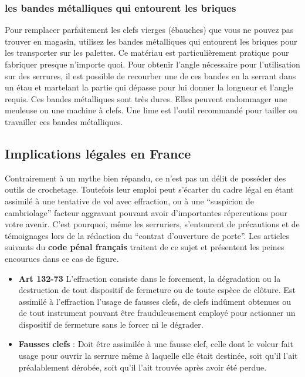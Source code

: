 \documentclass[a4paper,french,11pt,twoside]{report}
\begin{document}
\subsubsection{les bandes métalliques qui entourent les briques}
Pour remplacer parfaitement les clefs vierges (ébauches) que vous ne pouvez pas trouver en magasin, utilisez les bandes métalliques qui entourent les briques pour les transporter sur les palettes. Ce matériau est particulièrement pratique pour fabriquer presque n'importe quoi. Pour obtenir l'angle nécessaire pour l'utilisation sur des serrures, il est possible de recourber une de ces bandes en la serrant dans un étau et martelant la partie qui dépasse pour lui donner la longueur et l'angle requis. Ces bandes métalliques sont très dures. Elles peuvent endommager une meuleuse ou une machine à clefs. Une lime est l'outil recommandé pour tailler ou travailler ces bandes métalliques.

\subsection{Implications légales en France}
Contrairement à un mythe bien répandu, ce n'est pas un délit de posséder des outils de crochetage. Toutefois leur emploi peut s'écarter du cadre légal en étant assimilé à une tentative de vol avec effraction, ou à une \enquote{suspicion de cambriolage} facteur aggravant pouvant avoir d'importantes répercutions pour votre avenir. C'est pourquoi, même les serruriers, s'entourent de précautions et de témoignages lors de la rédaction du \enquote{contrat d'ouverture de porte}.
Les articles suivants du \textbf{code pénal français} traitent de ce sujet et présentent les peines encourues dans ce cas de figure.

 \begin{itemize}
    \item{\textbf{Art 132-73} L'effraction consiste dans le forcement, la dégradation ou la destruction de tout dispositif de fermeture ou de toute espèce de clôture. Est assimilé à l'effraction l'usage de fausses clefs, de clefs indûment obtenues ou de tout instrument pouvant être frauduleusement employé pour actionner un dispositif de fermeture sans le forcer ni le dégrader.}
    \item{\textbf{Fausses clefs} : Doit être assimilée à une fausse clef, celle dont le voleur fait usage pour ouvrir la serrure même à laquelle elle était destinée, soit qu'il l'ait préalablement dérobée, soit qu'il l'ait trouvée après avoir été perdue.}
\end{itemize}
\end{document}
